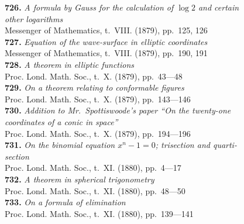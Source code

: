 \documentclass[11pt,a4paper]{book}
\begin{document}
\textbf{726.} \textit{A formula by Gauss for the calculation of $\log 2$ and certain}\\
\hspace*{2em}\textit{other logarithms} \\
\hspace*{2em}Messenger of Mathematics, t.~VIII. (1879), pp.~125, 126\\[0.3em]
\textbf{727.} \textit{Equation of the wave-surface in elliptic coordinates} \\
\hspace*{2em}Messenger of Mathematics, t.~VIII. (1879), pp.~190, 191\\[0.3em]
\textbf{728.} \textit{A theorem in elliptic functions} \\
\hspace*{2em}Proc. Lond. Math. Soc., t.~X. (1879), pp.~43---48\\[0.3em]
\textbf{729.} \textit{On a theorem relating to conformable figures} \\
\hspace*{2em}Proc. Lond. Math. Soc., t.~X. (1879), pp.~143---146\\[0.3em]
\textbf{730.} \textit{Addition to Mr.~Spottiswoode's paper ``On the twenty-one}\\
\hspace*{2em}\textit{coordinates of a conic in space''} \\
\hspace*{2em}Proc. Lond. Math. Soc., t.~X. (1879), pp.~194---196\\[0.3em]
\textbf{731.} \textit{On the binomial equation $x^n - 1 = 0$; trisection and quarti-}\\
\hspace*{2em}\textit{section} \\
\hspace*{2em}Proc. Lond. Math. Soc., t.~XI. (1880), pp.~4---17\\[0.3em]
\textbf{732.} \textit{A theorem in spherical trigonometry} \\
\hspace*{2em}Proc. Lond. Math. Soc., t.~XI. (1880), pp.~48---50\\[0.3em]
\textbf{733.} \textit{On a formula of elimination} \\
\hspace*{2em}Proc. Lond. Math. Soc., t.~XI. (1880), pp.~139---141\\[0.3em]
\end{document}
